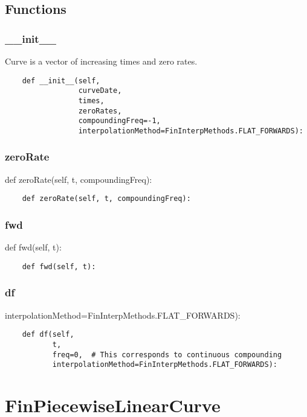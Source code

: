 \documentclass[twoside,11pt]{book}
\begin{document}
\subsection*{Functions}

\subsubsection*{{\bf \_\_init\_\_}}
Curve is a vector of increasing times and zero rates.  

\begin{lstlisting}
    def __init__(self,
                 curveDate,
                 times,
                 zeroRates,
                 compoundingFreq=-1,
                 interpolationMethod=FinInterpMethods.FLAT_FORWARDS):
\end{lstlisting}

\subsubsection*{{\bf zeroRate}}
def zeroRate(self, t, compoundingFreq): 

\begin{lstlisting}
    def zeroRate(self, t, compoundingFreq):
\end{lstlisting}

\subsubsection*{{\bf fwd}}
def fwd(self, t): 

\begin{lstlisting}
    def fwd(self, t):
\end{lstlisting}

\subsubsection*{{\bf df}}
interpolationMethod=FinInterpMethods.FLAT\_FORWARDS): 

\begin{lstlisting}
    def df(self,
           t,
           freq=0,  # This corresponds to continuous compounding
           interpolationMethod=FinInterpMethods.FLAT_FORWARDS):
\end{lstlisting}

\newpage
\section{FinPiecewiseLinearCurve}
\end{document}
